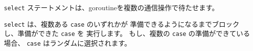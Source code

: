 \texttt{select} ステートメントは、goroutineを複数の通信操作で待たせます。

\texttt{select} は、複数ある \texttt{case} のいずれかが
準備できるようになるまでブロックし、準備ができた \texttt{case} を
実行します。 もし、複数の \texttt{case} の準備ができている場合、
\texttt{case} はランダムに選択されます。